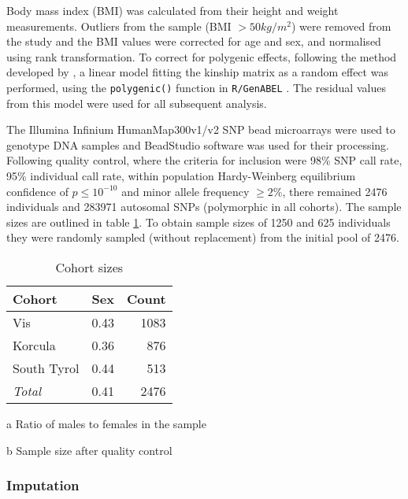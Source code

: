 Body mass index (BMI) was calculated from their height and weight measurements. Outliers from the sample (BMI $> 50kg/m^{2}$) were removed from the study and the BMI values were corrected for age and sex, and normalised using rank transformation. To correct for polygenic effects, following the method developed by \citet{Aulchenko2007}, a linear model fitting the kinship matrix as a random effect was performed, using the {\tt polygenic()} function in {\tt R/GenABEL} \citep{Aulchenko2007}. The residual values from this model were used for all subsequent analysis.

The Illumina Infinium HumanMap300v1/v2 SNP bead microarrays were used to genotype DNA samples and BeadStudio software was used for their processing. Following quality control, where the criteria for inclusion were 98\% SNP call rate, 95\% individual call rate, within population Hardy-Weinberg equilibrium confidence of $p \leq 10^{-10}$ and minor allele frequency $\geq 2\%$, there remained 2476 individuals and 283971 autosomal SNPs (polymorphic in all cohorts). The sample sizes are outlined in table \ref{tab:samplesizes}. To obtain sample sizes of 1250 and 625 individuals they were randomly sampled (without replacement) from the initial pool of 2476.

\begin{table}
  \begin{center}
  \begin{threeparttable}
  \caption{\label{tab:samplesizes}Cohort sizes}
    \begin{tabular}{lrr}
    \toprule
Cohort & Sex \tnote{a} & Count \tnote{b} \\
\midrule
Vis & 0.43 & 1083 \\
Korcula & 0.36 & 876 \\
South Tyrol & 0.44 & 513 \\
\midrule
\emph{Total} & 0.41 & 2476 \\
\bottomrule
\end{tabular}
\begin{tablenotes}{\footnotesize
\item[a] Ratio of males to females in the sample
\item[b] Sample size after quality control}
\end{tablenotes}
\end{threeparttable}
\end{center}
\end{table}


\subsubsection{Imputation}

